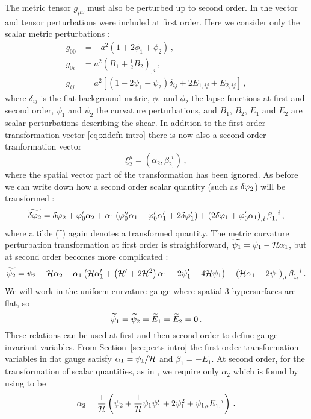 The metric tensor $g_{\mu\nu}$ must also be perturbed up to second order. In
 the vector and tensor perturbations were included at first
order. Here we consider only the scalar metric perturbations \cite{Malik:2008im}:
%
\begin{align}
\label{eq:metric1-num}
%
g_{00}&= -a^2\left(1+2\phi_1+\phi_2\right) \,, \nonumber\\
%
g_{0i}&= a^2\left(B_1+\frac{1}{2}B_2\right)_{,i}\,, \nonumber\\
%
g_{ij}&= a^2\left[\left(1-2\psi_1-\psi_2\right)\delta_{ij}
+2E_{1,ij}+E_{2,ij}\right]\,,
\end{align}
%
where $\delta_{ij}$ is the flat background metric, $\phi_1$ and $\phi_2$ the
lapse functions at first and second order, $\psi_1$ and $\psi_2$ the curvature
perturbations, and $B_1$, $B_2$, $E_1$ and $E_2$ are
scalar perturbations describing the shear.
% 
In addition to the first order transformation vector \eqref{eq:xidefn-intro} there is
now also a second order tranformation vector
% 
\begin{equation}
 \label{eq:xi2defn-perts}
\xi_2^\mu = (\alpha_2, \beta_{2,}^{~~i}) \,,
\end{equation}
% 
where the spatial vector part of the transformation has been ignored. As before we
can write down how a second order scalar quantity (such as $\delta\varphi_{2}$) will be
transformed \cite{Malik:2005cy}:
% 
\begin{equation}
\label{eq:dvp2transform-perts}
 \widetilde{\delta\varphi_{2}} = \delta\varphi_{2} + \varphi_0'\alpha_2 + \alpha_1\left(\varphi_0'' \alpha_1 + \varphi_0'
\alpha_1' + 2\delta\varphi_{1}'\right) + \left(2\delta\varphi_{1} + \varphi_0'\alpha_1\right)_{,i}
\beta_{1,}^{~~i} \,,
\end{equation}
% 
where a tilde ($\widetilde{~}$) again denotes a transformed quantity. 
The metric curvature perturbation transformation at first order is straightforward,
$\widetilde{\psi_1} = \psi_1 -\mathcal{H} \alpha_1$, but at second order becomes more complicated
\cite{Malik:2005cy}:
% 
\begin{equation}
 \label{eq:psi2transform-perts}
\widetilde{\psi_2} = \psi_2 -\mathcal{H}\alpha_2 -\alpha_1\left(\mathcal{H}\alpha_1' + 
              \left(\mathcal{H}' +2\mathcal{H}^2\right)\alpha_1 -2\psi_1' -4\mathcal{H}\psi_1\right)
              -\left(\mathcal{H}\alpha_1 -2\psi_1\right)_{,i} \beta_{1,}^{~~i}\,.
\end{equation}
% 
We will work in the uniform curvature gauge where spatial 3-hypersurfaces are flat,
so
%  
\begin{equation}
 \label{eq:gauge-num}
\widetilde\psi_1=\widetilde\psi_2=\widetilde E_1=\widetilde E_2=0 \,.
\end{equation}
% 
These relations can be used at first and then second order to define gauge
invariant variables. From Section~\ref{sec:perts-intro} the first order
transformation variables in flat gauge satisfy $\alpha_1 = \psi_1/\mathcal{H}$ and $\beta_1
= -E_1$. At second order, for the transformation of scalar quantities, as in
, we require only $\alpha_2$ which is found by using
 to be
\begin{equation}
 \label{eq:alpha2-perts}
\alpha_2 = \frac{1}{\mathcal{H}}\left( \psi_2 + \frac{1}{\mathcal{H}}\psi_1 \psi_1' + 2\psi_1^2 
             + \psi_{1,i} E_{1,}^{~~i} \right) \,.
\end{equation}

